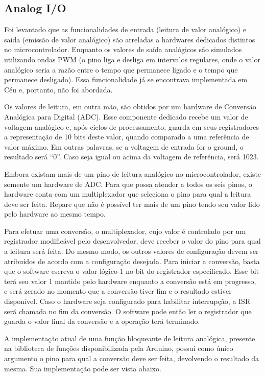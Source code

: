 \documentclass[11pt]{article}
\begin{document}
\subsection{Analog I/O}
\tab Foi levantado que as funcionalidades de entrada (leitura de valor analógico) e saída (emissão de valor analógico) são atreladas a hardwares dedicados distintos no microcontrolador. Enquanto os valores de saída analógicos são simulados utilizando ondas PWM (o pino liga e desliga em intervalos regulares, onde o valor analógico seria a razão entre o tempo que permanece ligado e o tempo que permanece desligado). Essa funcionalidade já se encontrava implementada em Céu e, portanto, não foi abordada.
\par Os valores de leitura, em outra mão, são obtidos por um hardware de Conversão Analógica para Digital (ADC). Esse componente dedicado recebe um valor de voltagem analógico e, após ciclos de processamento, guarda em seus registradores a representação de 10 bits deste valor, quando comparado a uma referência de valor máximo. Em outras palavras, se a voltagem de entrada for o ground, o resultado será “0”. Caso seja igual ou acima da voltagem de referência, será 1023. 
\par Embora existam mais de um pino de leitura analógico no microcontrolador, existe somente um hardware de ADC. Para que possa atender a todos os seis pinos, o hardware conta com um multiplexador que seleciona o pino para qual a leitura deve ser feita. Repare que não é possível ter mais de um pino tendo seu valor lido pelo hardware ao mesmo tempo. 
\par Para efetuar uma conversão, o multiplexador, cujo valor é controlado por um registrador modificável pelo desenvolvedor, deve receber o valor do pino para qual a leitura será feita. Do mesmo modo, os outros valores de configuração devem ser atribuídos de acordo com a configuração desejada. Para iniciar a conversão, basta que o software escreva o valor lógico 1 no bit do registrador especificado. Esse bit terá seu valor 1 mantido pelo hardware enquanto a conversão está em progresso, e será zerado no momento que a conversão tiver fim e o resultado estiver disponível. Caso o hardware seja configurado para habilitar interrupção, a ISR será chamada no fim da conversão. O software pode então ler o registrador que guarda o valor final da conversão e a operação terá terminado.
\par A implementação atual de uma função bloqueante de leitura analógica, presente na biblioteca de funções disponibilizada pela Arduino, possui como único argumento o pino para qual a conversão deve ser feita, devolvendo o resultado da mesma. Sua implementação pode ser vista abaixo.
\end{document}
